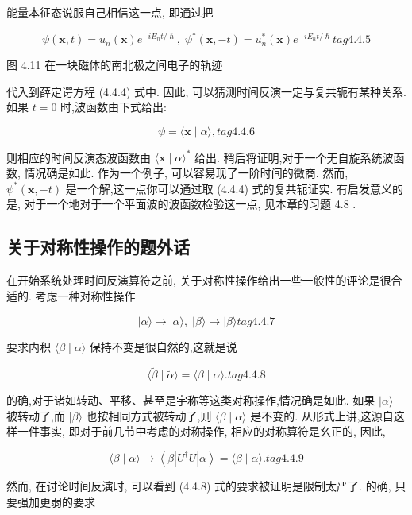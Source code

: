 能量本征态说服自己相信这一点, 即通过把

$$
\psi \left( {\mathbf{x}, t}\right) = {u}_{n}\left( \mathbf{x}\right) {e}^{-i{E}_{n}t/\hslash },\;{\psi }^{ * }\left( {\mathbf{x}, - t}\right) = {u}_{n}^{ * }\left( \mathbf{x}\right) {e}^{-i{E}_{n}t/\hslash } tag{4. 4.5}
$$



图 4.11 在一块磁体的南北极之间电子的轨迹

代入到薛定谔方程 (4.4.4) 式中. 因此, 可以猜测时间反演一定与复共轭有某种关系. 如果 $t = 0$ 时,波函数由下式给出:

$$
\psi = \langle \mathbf{x} \mid \alpha \rangle , tag{4. 4.6}
$$

则相应的时间反演态波函数由 $\langle \mathbf{x} \mid \alpha {\rangle }^{ * }$ 给出. 稍后将证明,对于一个无自旋系统波函数, 情况确是如此. 作为一个例子, 可以容易现了一阶时间的微商. 然而, ${\psi }^{ * }\left( {\mathbf{x}, - t}\right)$ 是一个解,这一点你可以通过取 (4.4.4) 式的复共轭证实. 有启发意义的是, 对于一个地对于一个平面波的波函数检验这一点, 见本章的习题 4.8 .

\subsection{关于对称性操作的题外话}

在开始系统处理时间反演算符之前, 关于对称性操作给出一些一般性的评论是很合适的. 考虑一种对称性操作

$$
\left| {\alpha \rangle \rightarrow }\right| \bar{\alpha }\rangle ,\;\left| {\beta \rangle \rightarrow }\right| \bar{\beta }\rangle tag{4. 4.7}
$$

要求内积 $\langle \beta \mid \alpha \rangle$ 保持不变是很自然的,这就是说

$$
\langle \widetilde{\beta } \mid \widetilde{\alpha }\rangle = \langle \beta \mid \alpha \rangle . tag{4. 4.8}
$$

的确,对于诸如转动、平移、甚至是宇称等这类对称操作,情况确是如此. 如果 $|\alpha \rangle$ 被转动了,而 $|\beta \rangle$ 也按相同方式被转动了,则 $\langle \beta \mid \alpha \rangle$ 是不变的. 从形式上讲,这源自这样一件事实, 即对于前几节中考虑的对称操作, 相应的对称算符是幺正的, 因此,

$$
\langle \beta \mid \alpha \rangle \rightarrow \left\langle {\beta \left| {{U}^{ \dagger }U}\right| \alpha }\right\rangle = \langle \beta \mid \alpha \rangle . tag{4. 4.9}
$$

然而, 在讨论时间反演时, 可以看到 (4.4.8) 式的要求被证明是限制太严了. 的确, 只要强加更弱的要求

